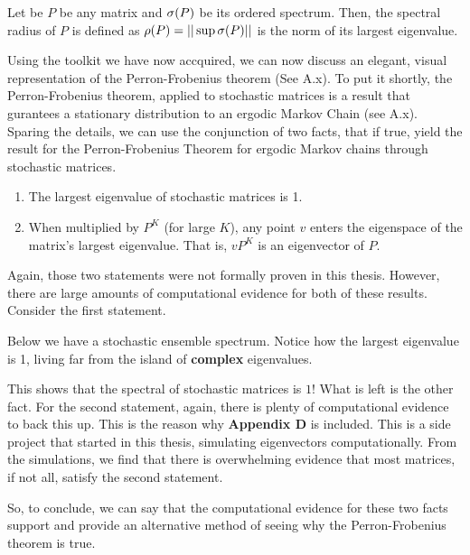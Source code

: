 \begin{definition}
  Let be $P$ be any matrix and $\sigma(P)$ be its ordered spectrum. Then, the spectral radius of $P$ is defined as $\rho(P) = ||\sup \sigma(P)||$ is the norm of its largest eigenvalue.
\end{definition}


Using the toolkit we have now accquired, we can now discuss an elegant, visual representation of the Perron-Frobenius theorem (See A.x). To put it shortly, the Perron-Frobenius theorem, applied to stochastic matrices is a result that gurantees a stationary distribution to an ergodic Markov Chain (see A.x). Sparing the details, we can use the conjunction of two facts, that if true, yield the result for the Perron-Frobenius Theorem for ergodic Markov chains through stochastic matrices.
\begin{enumerate}
  \item The largest eigenvalue of stochastic matrices is 1.
  \item When multiplied by $P^K$ (for large $K$), any point $v$ enters the eigenspace of the matrix's largest eigenvalue. That is, $v P^K$ is an eigenvector of $P$.
\end{enumerate}

Again, those two statements were not formally proven in this thesis. However, there are large amounts of computational evidence for both of these results. Consider the first statement.

Below we have a stochastic ensemble spectrum. Notice how the largest eigenvalue is 1, living far from the island of \textbf{complex} eigenvalues.


This shows that the spectral of stochastic matrices is $1$! What is left is the other fact. For the second statement, again, there is plenty of computational evidence to back this up. This is the reason why \textbf{Appendix D} is included. This is a side project that started in this thesis, simulating eigenvectors computationally. From the simulations, we find that there is overwhelming evidence that most matrices, if not all, satisfy the second statement.

 So, to conclude, we can say that the computational evidence for these two facts support and provide an alternative method of seeing why the Perron-Frobenius theorem is true.

